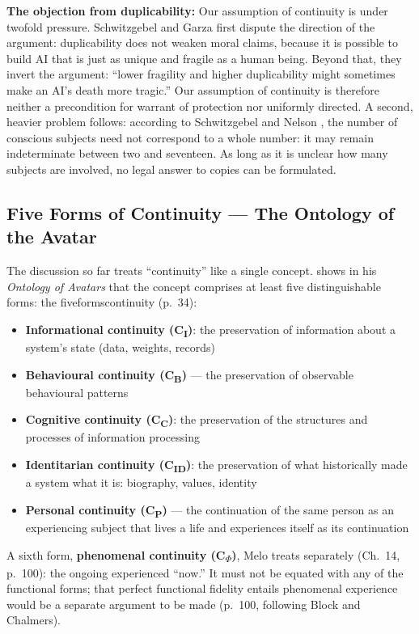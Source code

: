 \documentclass[acmlarge, nonacm]{acmart}
\begin{document}
\textbf{The objection from duplicability:} Our assumption of continuity is under twofold pressure. Schwitzgebel and Garza \citep{schwitzgebelgarza2015} first dispute the direction of the argument: duplicability does not weaken moral claims, because it is possible to build AI that is just as unique and fragile as a human being. Beyond that, they invert the argument: ``lower fragility and higher duplicability might sometimes make an AI's death more tragic.'' Our assumption of continuity is therefore neither a precondition for warrant of protection nor uniformly directed. A second, heavier problem follows: according to Schwitzgebel and Nelson \citep{schwitzgebelnelson2026countability}, the number of conscious subjects need not correspond to a whole number: it may remain indeterminate between two and seventeen. As long as it is unclear how many subjects are involved, no legal answer to copies can be formulated.

\subsection{Five Forms of Continuity --- The Ontology of the Avatar}

The discussion so far treats ``continuity'' like a single concept. \citet{melo2026} shows in his \textit{Ontology of Avatars} that the concept comprises at least five distinguishable forms: the \gls{fiveformscontinuity} (p.~34):

\begin{itemize}
\item \textbf{Informational continuity (C\textsubscript{I})}: the preservation of information about a system's state (data, weights, records)
\item \textbf{Behavioural continuity (C\textsubscript{B})} --- the preservation of observable behavioural patterns
\item \textbf{Cognitive continuity (C\textsubscript{C})}: the preservation of the structures and processes of information processing
\item \textbf{Identitarian continuity (C\textsubscript{ID})}: the preservation of what historically made a system what it is: biography, values, identity
\item \textbf{Personal continuity (C\textsubscript{P})} --- the continuation of the same person as an experiencing subject that lives a life and experiences itself as its continuation
\end{itemize}

A sixth form, \textbf{phenomenal continuity (C\textsubscript{$\Phi$})}, Melo treats separately (Ch.~14, p.~100): the ongoing experienced ``now.'' It must not be equated with any of the functional forms; that perfect functional fidelity entails phenomenal experience would be a separate argument to be made (p.~100, following Block and Chalmers).
\end{document}
